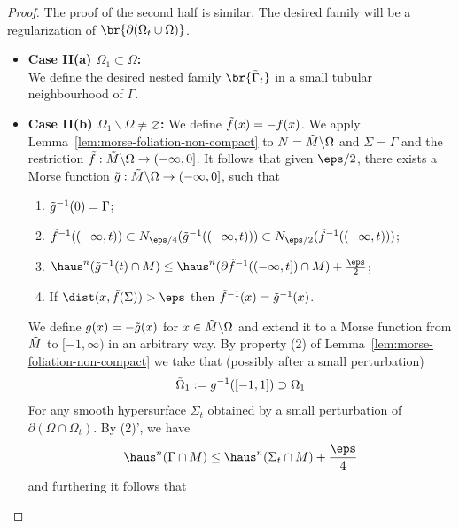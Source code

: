 \begin{lemma}
\begin{proof}
        The proof of the second half is similar. The desired family will be a regularization of $\br{\partial(\Omega_t\cup \Omega)}$.
        \begin{itemize}
            \item \textbf{Case II(a) $\Omega_1 \subset \Omega$:}\\
            We define the desired nested family $\br{\Tilde{\Gamma}_t}$ in a small tubular neighbourhood of $\Gamma$.
            \item \textbf{Case II(b) $\Omega_1\backslash\Omega \neq \varnothing$:}
            We define $\Tilde{f}(x) = -f(x)$. We apply Lemma~\ref{lem:morse-foliation-non-compact} to $N = \Tilde{M}\backslash\Omega$ and $\Sigma = \Gamma$ and the restriction $\Tilde{f}: \Tilde{M}\backslash\Omega \to (-\infty, 0]$. It follows that given $\eps/2$, there exists a Morse function
            $\Tilde{g}: \Tilde{M}\backslash\Omega \to (-\infty, 0]$, such that 
            \begin{enumerate}
                \item $\Tilde{g}^{-1}(0) = \Gamma$;
                \item $\Tilde{f}^{-1}((-\infty, t)) \subset N_{\eps/4}(\Tilde{g}^{-1}((-\infty, t))) \subset N_{\eps/2}(\Tilde{f}^{-1}((-\infty, t)))$;
                \item $\haus^n(\Tilde{g}^{-1}(t)\cap M) \leq \haus^n(\partial\Tilde{f}^{-1}((-\infty, t])\cap M) + \frac{\eps}{2}$;
                \item If $\dist(x, \Tilde{f}(\Sigma)) > \eps$ then $\Tilde{f}^{-1}(x) = \Tilde{g}^{-1}(x)$.
            \end{enumerate}
            We define $g(x) = -\Tilde{g}(x)$ for $x \in \Tilde{M}\backslash\Omega$ and extend it to a Morse function from $\Tilde{M}$ to $[-1, \infty)$ in an arbitrary way. By property (2) of Lemma~\ref{lem:morse-foliation-non-compact} we take that (possibly after a small perturbation)
            \begin{equation*}
               \Tilde{\Omega}_1 := g^{-1}([-1, 1]) \supset \Omega_1
            \end{equation*}
            For any smooth hypersurface $\Sigma_t$ obtained by a small perturbation of $\partial(\Omega\cap\Omega_t)$. By (2)', we have
            \begin{equation*}
                \haus^n(\Gamma\cap M) \leq \haus^n(\Sigma_t\cap M) + \frac{\eps}{4} 
            \end{equation*}
            and furthering it follows that
            \begin{equation*}

\end{equation*}
\end{itemize}
\end{proof}
\end{lemma}
